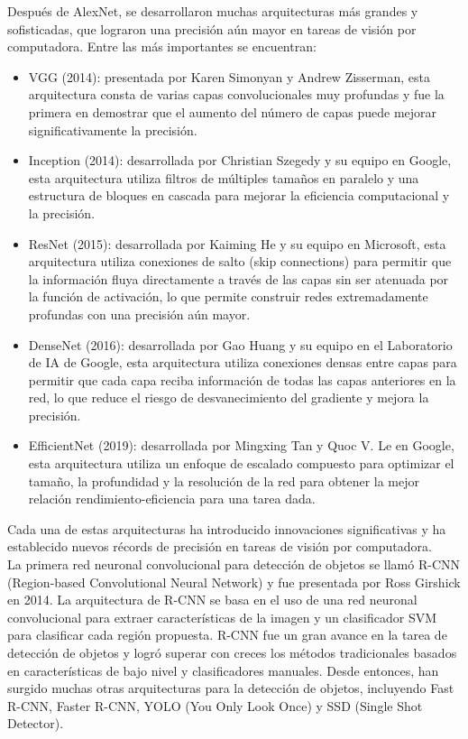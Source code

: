 \documentclass{article}
\begin{document}
Después de AlexNet, se desarrollaron muchas arquitecturas más grandes y sofisticadas, que lograron una precisión aún mayor en tareas de visión por computadora. Entre las más importantes se encuentran:

\begin{itemize}
  \item VGG (2014): presentada por Karen Simonyan y Andrew Zisserman, esta arquitectura consta de varias capas convolucionales muy profundas y fue la primera en demostrar que el aumento del número de capas puede mejorar significativamente la precisión.
  \item Inception (2014): desarrollada por Christian Szegedy y su equipo en Google, esta arquitectura utiliza filtros de múltiples tamaños en paralelo y una estructura de bloques en cascada para mejorar la eficiencia computacional y la precisión.
  \item ResNet (2015): desarrollada por Kaiming He y su equipo en Microsoft, esta arquitectura utiliza conexiones de salto (skip connections) para permitir que la información fluya directamente a través de las capas sin ser atenuada por la función de activación, lo que permite construir redes extremadamente profundas con una precisión aún mayor.
  \item DenseNet (2016): desarrollada por Gao Huang y su equipo en el Laboratorio de IA de Google, esta arquitectura utiliza conexiones densas entre capas para permitir que cada capa reciba información de todas las capas anteriores en la red, lo que reduce el riesgo de desvanecimiento del gradiente y mejora la precisión.
  \item EfficientNet (2019): desarrollada por Mingxing Tan y Quoc V. Le en Google, esta arquitectura utiliza un enfoque de escalado compuesto para optimizar el tamaño, la profundidad y la resolución de la red para obtener la mejor relación rendimiento-eficiencia para una tarea dada.
\end{itemize}

Cada una de estas arquitecturas ha introducido innovaciones significativas y ha establecido nuevos récords de precisión en tareas de visión por computadora.\\


La primera red neuronal convolucional para detección de objetos se llamó R-CNN (Region-based Convolutional Neural Network) y fue presentada por Ross Girshick en 2014. La arquitectura de R-CNN se basa en el uso de una red neuronal convolucional para extraer características de la imagen y un clasificador SVM para clasificar cada región propuesta. R-CNN fue un gran avance en la tarea de detección de objetos y logró superar con creces los métodos tradicionales basados en características de bajo nivel y clasificadores manuales. Desde entonces, han surgido muchas otras arquitecturas para la detección de objetos, incluyendo Fast R-CNN, Faster R-CNN, YOLO (You Only Look Once) y SSD (Single Shot Detector).
\end{document}
